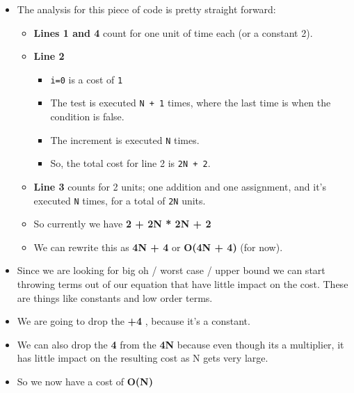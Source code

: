 \begin{itemize}
	\tightlist
	\item
	      The analysis for this piece of code is pretty straight forward:
	      
	      \begin{itemize}
	      	\tightlist
	      	\item
	      	      \textbf{Lines 1 and 4} count for one unit of time each (or a
	      	      constant 2).
	      	\item
	      	      \textbf{Line 2}
	      	      
	      	      \begin{itemize}
	      	      	\tightlist
	      	      	\item
	      	      	      \texttt{i=0} is a cost of \texttt{1}
	      	      	\item
	      	      	      The test is executed \texttt{N\ +\ 1} times, where the last time
	      	      	      is when the condition is false.
	      	      	\item
	      	      	      The increment is executed \texttt{N} times.
	      	      	\item
	      	      	      So, the total cost for line 2 is \texttt{2N\ +\ 2}.
	      	      \end{itemize}
	      	\item
	      	      \textbf{Line 3} counts for 2 units; one addition and one assignment,
	      	      and it's executed \texttt{N} times, for a total of \texttt{2N}
	      	      units.
	      	\item
	      	      So currently we have \textbf{2 + 2N * 2N + 2}
	      	\item
	      	      We can rewrite this as \textbf{4N + 4} or \textbf{O(4N + 4)} (for
	      	      now).
	      \end{itemize}
	\item
	      Since we are looking for big oh / worst case / upper bound we can
	      start throwing terms out of our equation that have little impact on
	      the cost. These are things like constants and low order terms.
	\item
	      We are going to drop the \textbf{+4} , because it's a constant.
	\item
	      We can also drop the \textbf{4} from the \textbf{4N} because even
	      though its a multiplier, it has little impact on the resulting cost as
	      N gets very large.
	\item
	      So we now have a cost of \textbf{O(N)}
\end{itemize}

